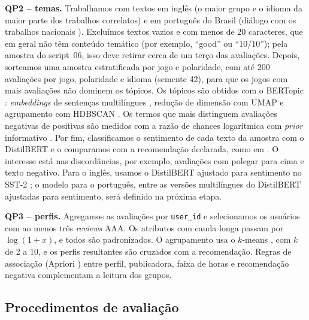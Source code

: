 \documentclass[12pt]{article}
\begin{document}
\textbf{QP2 -- temas.} Trabalhamos com textos em inglês (o maior grupo e o idioma da maior
parte dos trabalhos correlatos) e em português do Brasil (diálogo com os trabalhos nacionais
\cite{gibrim2026,jorge2023}). Excluímos textos vazios e com menos de 20 caracteres, que em geral não têm conteúdo
temático (por exemplo, ``good'' ou ``10/10''); pela amostra do script~06, isso deve retirar
cerca de um terço das avaliações. Depois, sorteamos uma amostra estratificada por jogo e polaridade, com até 200 avaliações por
jogo, polaridade e idioma (semente 42), para que os jogos com mais avaliações não dominem os
tópicos. Os tópicos são obtidos com o BERTopic \cite{grootendorst2022}: \textit{embeddings} de
sentenças multilíngues \cite{reimers2019,reimers2020}, redução de dimensão com UMAP
\cite{mcinnes2018} e agrupamento com HDBSCAN \cite{campello2013}. Os termos que mais distinguem
avaliações negativas de positivas são medidos com a razão de chances logarítmica com
\textit{prior} informativo \cite{monroe2008}. Por fim, classificamos o sentimento de cada texto da
amostra com o DistilBERT \cite{sanh2019} e o comparamos com a recomendação declarada, como em
\cite{bazzaz2026}. O interesse está nas discordâncias, por exemplo, avaliações com polegar para
cima e texto negativo. Para o inglês, usamos o DistilBERT ajustado para sentimento no SST-2
\cite{socher2013}; o modelo para o português, entre as versões multilíngues do DistilBERT
ajustadas para sentimento, será definido na próxima etapa.

\textbf{QP3 -- perfis.} Agregamos as avaliações por \texttt{user\_id} e selecionamos os usuários
com ao menos três \textit{reviews} AAA. Os atributos com cauda longa passam por $\log(1+x)$, e
todos são padronizados. O agrupamento usa o $k$-means \cite{lloyd1982}, com $k$ de 2 a 10, e os
perfis resultantes são cruzados com a recomendação. Regras de associação (Apriori
\cite{agrawal1994}) entre perfil, publicadora, faixa de horas e recomendação negativa
complementam a leitura dos grupos.

\subsection{Procedimentos de avaliação}
\end{document}
